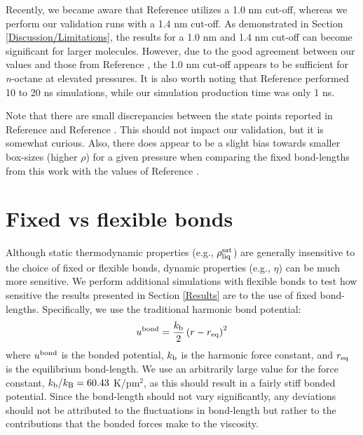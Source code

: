 \documentclass[preprint,review,12pt]{elsarticle}
\begin{document}
    
    Recently, we became aware that Reference  utilizes a 1.0 nm cut-off, whereas we perform our validation runs with a 1.4 nm cut-off. As demonstrated in Section \ref{Discussion/Limitations}, the results for a 1.0 nm and 1.4 nm cut-off can become significant for larger molecules. However, due to the good agreement between our values and those from Reference , the 1.0 nm cut-off appears to be sufficient for \textit{n}-octane at elevated pressures. It is also worth noting that Reference  performed 10 to 20 ns simulations, while our simulation production time was only 1 ns.
    
    Note that there are small discrepancies between the state points reported in Reference  and Reference . This should not impact our validation, but it is somewhat curious. Also, there does appear to be a slight bias towards smaller box-sizes (higher $\rho$) for a given pressure when comparing the fixed bond-lengths from this work with the values of Reference . 
    
%	
	
	\section{Fixed vs flexible bonds} \label{fixed flexible}
	
	
    Although static thermodynamic properties (e.g., $\rho_{\rm liq}^{\rm sat}$) are generally insensitive to the choice of fixed or flexible bonds, dynamic properties (e.g., $\eta$) can be much more sensitive. We perform additional simulations with flexible bonds to test how sensitive the results presented in Section \ref{Results} are to the use of fixed bond-lengths. Specifically, we use the traditional harmonic bond potential:
    \begin{equation} \label{eq:harmonic_bond}
    u^{\rm bond} = \frac{k_{\rm b}}{2} \left(r-r_{\rm eq}\right)^2
    \end{equation}
    where $u^{\rm bond}$ is the bonded potential, $k_{\rm b}$ is the harmonic force constant, and $r_{\rm eq}$ is the equilibrium bond-length. We use an arbitrarily large value for the force constant, $k_{\rm b}/k_{\rm B} = 60.43$ K/pm$^2$, as this should result in a fairly stiff bonded potential. Since the bond-length should not vary significantly, any deviations should not be attributed to the fluctuations in bond-length but rather to the contributions that the bonded forces make to the viscosity. 
    
\end{document}

